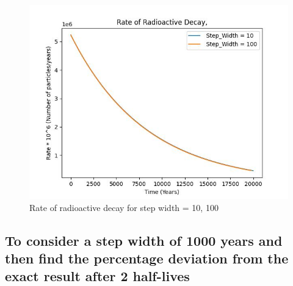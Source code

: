 \documentclass[11pt]{article}
\begin{document}
\begin{figure}[b]
    \centering
    \includegraphics[width=\textwidth, height=\textheight, keepaspectratio]{Carbon_plot_10_100.jpeg}
    \caption{Rate of radioactive decay for step width = 10, 100}
    \label{fig:Rate of radioactive decay for step width = 10, 100}
\end{figure}

\subsection{To consider a step width of 1000 years and then find the percentage deviation from the exact result after 2 half-lives}
\end{document}
